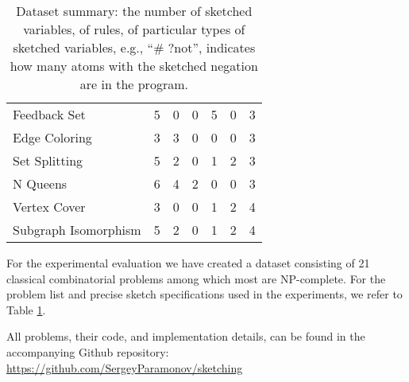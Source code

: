 \begin{table}[h]
\begin{tabular}{l | c c c c c c}
Feedback Set            &        5              &   0  &  0    &    5    &   0   &    3    \\
Edge Coloring           &        3              &   3  &  0    &    0    &   0   &    3    \\
Set Splitting           &        5              &   2  &  0    &    1    &   2   &    3    \\
N Queens                &        6              &   4  &  2    &    0    &   0   &    3    \\
Vertex Cover            &        3              &   0  &  0    &    1    &   2   &    4    \\
Subgraph Isomorphism    &        5              &   2  &  0    &    1    &   2   &    4    \\
\end{tabular}

\caption{Dataset summary: the number of sketched variables, of rules, of particular types of sketched variables, e.g., ``\# ?not'', indicates how many atoms with the sketched negation are in the program.}
\label{tab:dataset_description}
\end{table}
For the experimental evaluation we have created a dataset consisting 
of 21 classical combinatorial problems among which most are
NP-complete. For the problem list and precise sketch specifications used in the experiments, we refer to Table \ref{tab:dataset_description}. 

All problems, their code, and implementation details, can be found in the accompanying Github repository: {\small\url{https://github.com/SergeyParamonov/sketching}}

